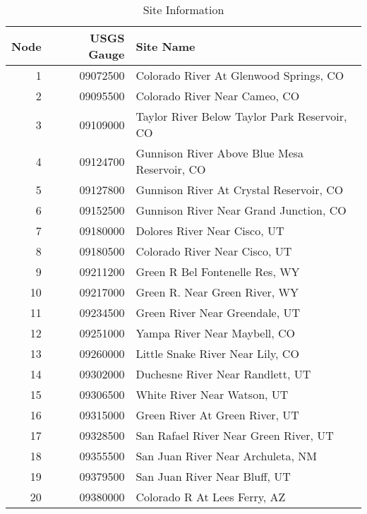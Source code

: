 \documentclass[final,5p,times,twocolumn,authoryear]{elsarticle}
\begin{document}
\begin{table}[ht]
\begin{center}
\caption{Site Information}\label{tab:sites}
\begin{tabular}{rrp{5cm}}
  \toprule
 Node & USGS Gauge & Site Name \\ 
  \midrule
  1  & 09072500 &  Colorado River At Glenwood Springs, CO        \\ 
  2  & 09095500 &  Colorado River Near Cameo, CO                 \\ 
  3  & 09109000 &  Taylor River Below Taylor Park Reservoir, CO  \\ 
  4  & 09124700 &  Gunnison River Above Blue Mesa Reservoir, CO \\ 
  5  & 09127800 &  Gunnison River At Crystal Reservoir, CO       \\ 
  6  & 09152500 &  Gunnison River Near Grand Junction, CO        \\ 
  7  & 09180000 &  Dolores River Near Cisco, UT                  \\ 
  8  & 09180500 &  Colorado River Near Cisco, UT                 \\ 
  9  & 09211200 &  Green R Bel Fontenelle Res, WY                \\ 
  10 & 09217000 &  Green R. Near Green River, WY                   \\ 
  11 & 09234500 &  Green River Near Greendale, UT                \\ 
  12 & 09251000 &  Yampa River Near Maybell, CO                  \\ 
  13 & 09260000 &  Little Snake River Near Lily, CO              \\ 
  14 & 09302000 &  Duchesne River Near Randlett, UT              \\ 
  15 & 09306500 &  White River Near Watson, UT                   \\ 
  16 & 09315000 &  Green River At Green River, UT                \\ 
  17 & 09328500 &  San Rafael River Near Green River, UT         \\ 
  18 & 09355500 &  San Juan River Near Archuleta, NM             \\ 
  19 & 09379500 &  San Juan River Near Bluff, UT                 \\ 
  20 & 09380000 &  Colorado R At Lees Ferry, AZ                  \\ 
   \bottomrule
\end{tabular}
\end{center}
\end{table}
\end{document}

